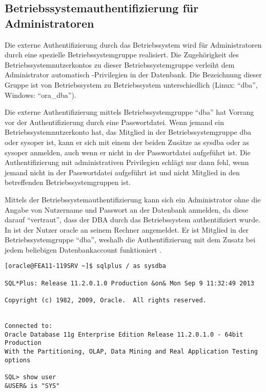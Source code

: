       \subsection{Betriebssystemauthentifizierung f\"ur Administratoren}
        Die externe Authentifizierung durch das Betriebssystem wird f\"ur Administratoren durch eine spezielle Betriebssystemgruppe realisiert. Die Zugeh\"origkeit des Betriebssystemnutzerkontos zu dieser Betriebssystemgruppe verleiht dem Administrator automatisch -Privilegien in der Datenbank. Die Bezeichnung dieser Gruppe ist von Betriebssystem zu Betriebssystem unterschiedlich (Linux: \enquote{dba}, Windows: \enquote{ora\_dba}).
        \begin{merke}
          Die externe Authentifizierung mittels Betriebssystemgruppe \enquote{dba} hat Vorrang vor der Authentifizierung durch eine Passwortdatei. Wenn jemand ein Betriebssystemnutzerkonto hat, das Mitglied in der Betriebssystemgruppe dba oder sysoper ist, kann er sich mit einem der beiden Zus\"atze as sysdba oder as sysoper anmelden, auch wenn er nicht in der Passwortdatei aufgef\"uhrt ist. Die Authentifizierung mit administrativen Privilegien schl\"agt nur dann fehl, wenn jemand nicht in der Passwortdatei aufgef\"uhrt ist und nicht Mitglied in den betreffenden Betriebssystemgruppen ist.
        \end{merke}
        Mittels der Betriebssystemauthentifizierung kann sich ein Administrator ohne die Angabe von Nutzername und Passwort an der Datenbank anmelden, da diese darauf \enquote{vertraut}, dass der DBA durch das Betriebssystem authentifiziert wurde. In  ist der Nutzer oracle an seinem Rechner angemeldet. Er ist Mitglied in der Betriebssystemgruppe \enquote{dba}, weshalb die Authentifizierung mit dem Zusatz  bei jedem beliebigen Datenbankaccount funktioniert .

          \begin{lstlisting}[caption={Die Betriebssystemauthentifizierung f\"ur
          Administratoren},label=admin215,language=oracle_sql,alsolanguage=sqlplus]
[oracle@FEA11-119SRV ~]$ sqlplus / as sysdba

SQL*Plus: Release 11.2.0.1.0 Production &on& Mon Sep 9 11:32:49 2013

Copyright (c) 1982, 2009, Oracle.  All rights reserved.


Connected to:
Oracle Database 11g Enterprise Edition Release 11.2.0.1.0 - 64bit Production
With the Partitioning, OLAP, Data Mining and Real Application Testing options

SQL> show user
&USER& is "SYS"
          \end{lstlisting}
          \begin{literaturinternet}
            \item \cite{i1006534}
          \end{literaturinternet}
